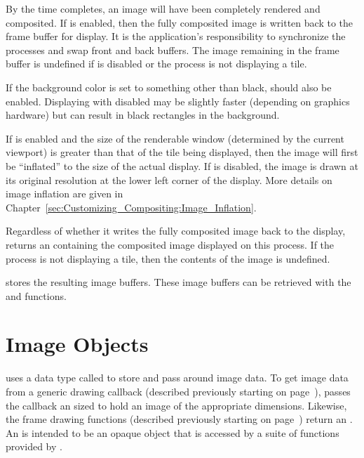 By the time  completes, an image will have been
completely rendered and composited.  If  is
enabled, then the fully composited image is written back to the \OpenGL
frame buffer for display.  It is the application's responsibility to
synchronize the processes and swap front and back buffers.  The image
remaining in the frame buffer is undefined if  is
disabled or the process is not displaying a tile.

If the \OpenGL background color is set to something other than black,
 should also be enabled.
Displaying with  disabled may
be slightly faster (depending on graphics hardware) but can result in black
rectangles in the background.

If  is enabled and the size of the
renderable window (determined by the current \OpenGL viewport) is greater
than that of the tile being displayed, then the image will first be
``inflated'' to the size of the actual display.  If
 is disabled, the image is drawn at its
original resolution at the lower left corner of the display.  More details
on image inflation are given in
Chapter~\ref{sec:Customizing_Compositing:Image_Inflation}.

Regardless of whether it writes the fully composited image back to the
display,  returns an  containing
the composited image displayed on this process.  If the process is not
displaying a tile, then the contents of the image is undefined.

\IceT stores the resulting image buffers.  These image buffers can
be retrieved with the  and 
functions.


\section{Image Objects}
\label{sec:Basic_Usage:Image_Objects}

\IceT uses a data type called  to store and pass around
image data.  To get image data from a generic drawing callback (described
previously starting on
page~\pageref{sec:Basic_Usage:Drawing_Callback:Generic}), \IceT passes the
callback an  sized to hold an image of the appropriate
dimensions.  Likewise, the frame drawing functions (described previously
starting on page~\pageref{sec:Basic_Usage:Rendering}) return an
.  An  is intended to be an opaque object
that is accessed by a suite of functions provided by \IceT.

